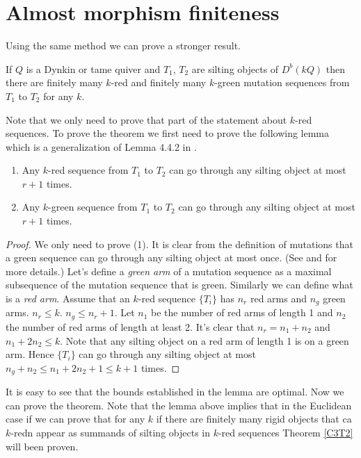 \section{Almost morphism finiteness}
\indent Using the same method we can prove a stronger result.
\begin{theorem}\label{C3T2}
If $Q$ is a Dynkin or tame quiver and $T_1$, $T_2$ are silting objects of $D^b(kQ)$ then there are finitely many $k$-red and finitely many $k$-green mutation sequences from $T_1$ to $T_2$ for any $k$.
\end{theorem}
\indent Note that we only need to prove that part of the statement about $k$-red sequences. To prove the theorem we first need to prove the following lemma which is a generalization of Lemma 4.4.2 in \cite{BHIT15}.
\begin{lemma}
\begin{enumerate}
\item Any $k$-red sequence from $T_1$ to $T_2$ can go through any silting object at most $r+1$ times.
\item Any $k$-green sequence from $T_1$ to $T_2$ can go through any silting object at most $r+1$ times.
\end{enumerate}
\end{lemma}
\begin{proof}
We only need to prove (1). It is clear from the definition of mutations that a green sequence can go through any silting object at most once. (See \cite{BY13} and \cite{KY12} for more details.) Let's define a \textit{green arm} of a mutation sequence as a maximal subsequence of the mutation sequence that is green. Similarly we can define what is a \textit{red arm}. Assume that an $k$-red sequence $\{T_i\}$ has $n_r$ red arms and $n_g$ green arms. $n_r\leq k$. $n_g\leq n_r+1$. Let $n_1$ be the number of red arms of length 1 and $n_2$ the number of red arms of length at least 2. It's clear that $n_r=n_1+n_2$ and $n_1+2n_2\leq k$. Note that any silting object on a red arm of length 1 is on a green arm. Hence $\{T_i\}$ can go through any silting object at most $n_g+n_2\leq n_1+2n_2+1\leq k+1$ times.
\end{proof}
\indent It is easy to see that the bounds established in the lemma are optimal. Now we can prove the theorem. Note that the lemma above implies that in the Euclidean case if we can prove that for any $k$ if there are finitely many rigid objects that ca$k$-redn appear as summands of silting objects in $k$-red sequences Theorem \ref{C3T2} will been proven. 
